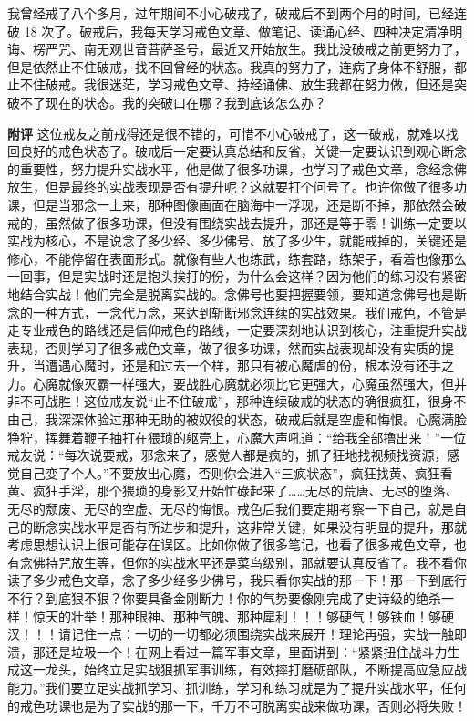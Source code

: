 \begin{case}
    我曾经戒了八个多月，过年期间不小心破戒了，破戒后不到两个月的时间，已经连破 18 次了。破戒后，我每天学习戒色文章、做笔记、读诵心经、四种决定清净明诲、楞严咒、南无观世音菩萨圣号，最近又开始放生。我比没破戒之前更努力了，但是依然止不住破戒，找不回曾经的状态。我真的努力了，连病了身体不舒服，都止不住破戒。我很迷茫，学习戒色文章、持经诵佛、放生我都在努力做，但还是突破不了现在的状态。我的突破口在哪？我到底该怎么办？

    \textbf{附评} 这位戒友之前戒得还是很不错的，可惜不小心破戒了，这一破戒，就难以找回良好的戒色状态了。破戒后一定要认真总结和反省，关键一定要认识到观心断念的重要性，努力提升实战水平，他是做了很多功课，也学习了戒色文章，念经念佛放生，但是最终的实战表现是否有提升呢？这就要打个问号了。也许你做了很多功课，但是当邪念一上来，那种图像画面在脑海中一浮现，还是断不掉，那依然会破戒的，虽然做了很多功课，但没有围绕实战去提升，那还是等于零！训练一定要以实战为核心，不是说念了多少经、多少佛号、放了多少生，就能戒掉的，关键还是修心，不能停留在表面形式。就像有些人也练武，练套路，练架子，看着也像那么一回事，但是实战时还是抱头挨打的份，为什么会这样？因为他们的练习没有紧密地结合实战！他们完全是脱离实战的。念佛号也要把握要领，要知道念佛号也是断念的一种方式，一念代万念，来达到斩断邪念连续的实战效果。我们戒色，不管是走专业戒色的路线还是信仰戒色的路线，一定要深刻地认识到核心，注重提升实战表现，否则学习了很多戒色文章，做了很多功课，然而实战表现却没有实质的提升，当遭遇心魔时，还是和过去一个样，那只有被心魔虐的份，根本没有还手之力。心魔就像灭霸一样强大，要战胜心魔就必须比它更强大，心魔虽然强大，但并非不可战胜！这位戒友说“止不住破戒”，那种连续破戒的状态的确很疯狂，很身不由己，我深深体验过那种无助的被奴役的状态，破戒后就是空虚和悔恨。心魔满脸狰狞，挥舞着鞭子抽打在猥琐的躯壳上，心魔大声吼道：“给我全部撸出来！”一位戒友说：“每次说要戒，邪念来了，感觉人都是疯的，抓了狂地找视频找资源，感觉自己变了个人。”不要放出心魔，否则你会进入“三疯状态”，疯狂找黄、疯狂看黄、疯狂手淫，那个猥琐的身影又开始忙碌起来了……无尽的荒唐、无尽的堕落、无尽的颓废、无尽的空虚、无尽的悔恨。戒色后我们要定期考察一下自己，就是自己的断念实战水平是否有所进步和提升，这非常关键，如果没有明显的提升，那就考虑思想认识上很可能存在误区。比如你做了很多笔记，也看了很多戒色文章，也有念佛持咒放生等，但你的实战水平还是菜鸟级别，那就要认真反省了。我不看你读了多少戒色文章，念了多少经多少佛号，我只看你实战的那一下！那一下到底行不行？到底狠不狠？你要具备金刚断力！你的气势要像刚完成了史诗级的绝杀一样！惊天的壮举！那种眼神、那种气魄、那种犀利！！！够硬气！够铁血！够硬汉！！！请记住一点：一切的一切都必须围绕实战来展开！理论再强，实战一触即溃，那还是垃圾一个！在网上看过一篇军事文章，里面讲到：“紧紧扭住战斗力生成这一龙头，始终立足实战狠抓军事训练，有效摔打磨砺部队，不断提高应急应战能力。”我们要立足实战抓学习、抓训练，学习和练习就是为了提升实战水平，任何的戒色功课也是为了实战的那一下，千万不可脱离实战来做功课，否则必将失败！
\end{case}

